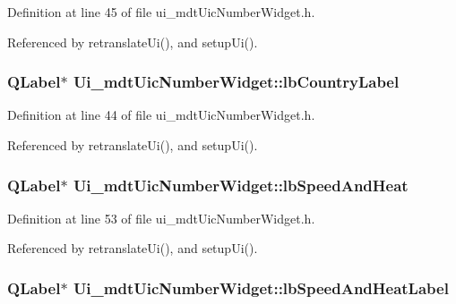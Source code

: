 Definition at line 45 of file ui\-\_\-mdt\-Uic\-Number\-Widget.\-h.



Referenced by retranslate\-Ui(), and setup\-Ui().

\hypertarget{class_ui__mdt_uic_number_widget_afcc2536695dfb6853333913fcb3a0d78}{
\subsubsection[{lb\-Country\-Label}]{\setlength{\rightskip}{0pt plus 5cm}Q\-Label$\ast$ Ui\-\_\-mdt\-Uic\-Number\-Widget\-::lb\-Country\-Label}}\label{class_ui__mdt_uic_number_widget_afcc2536695dfb6853333913fcb3a0d78}


Definition at line 44 of file ui\-\_\-mdt\-Uic\-Number\-Widget.\-h.



Referenced by retranslate\-Ui(), and setup\-Ui().

\hypertarget{class_ui__mdt_uic_number_widget_a70bc0c6891d72ad06d7232cf69b3fbfb}{
\subsubsection[{lb\-Speed\-And\-Heat}]{\setlength{\rightskip}{0pt plus 5cm}Q\-Label$\ast$ Ui\-\_\-mdt\-Uic\-Number\-Widget\-::lb\-Speed\-And\-Heat}}\label{class_ui__mdt_uic_number_widget_a70bc0c6891d72ad06d7232cf69b3fbfb}


Definition at line 53 of file ui\-\_\-mdt\-Uic\-Number\-Widget.\-h.



Referenced by retranslate\-Ui(), and setup\-Ui().

\hypertarget{class_ui__mdt_uic_number_widget_aca809f69642289650a0c63243215c7d4}{
\subsubsection[{lb\-Speed\-And\-Heat\-Label}]{\setlength{\rightskip}{0pt plus 5cm}Q\-Label$\ast$ Ui\-\_\-mdt\-Uic\-Number\-Widget\-::lb\-Speed\-And\-Heat\-Label}}\label{class_ui__mdt_uic_number_widget_aca809f69642289650a0c63243215c7d4}


